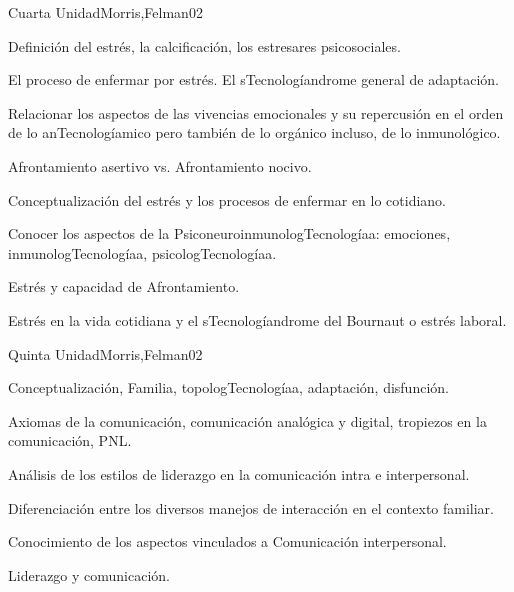 \begin{syllabus}
\begin{unit}{Cuarta Unidad}{Morris,Felman}{0}{2}
\begin{topics}
	\item Definición del estrés, la calcificación, los estresares psicosociales.
	\item El proceso de enfermar por estrés. El sTecnologíandrome general de adaptación.
	\item Relacionar los aspectos de las vivencias emocionales y su repercusión en el orden de lo anTecnologíamico pero también de lo orgánico incluso, de lo inmunológico.
	\item Afrontamiento asertivo vs. Afrontamiento nocivo.
\end{topics}
\begin{learningoutcomes}
	\item Conceptualización del estrés y los procesos de enfermar en lo cotidiano.
	\item Conocer los aspectos de la PsiconeuroinmunologTecnologíaa: emociones, inmunologTecnologíaa, psicologTecnologíaa.
	\item Estrés y capacidad de Afrontamiento.
	\item Estrés en la vida cotidiana y el sTecnologíandrome del Bournaut o estrés laboral.
\end{learningoutcomes}
\end{unit}

\begin{unit}{Quinta Unidad}{Morris,Felman}{0}{2}
\begin{topics}
	\item Conceptualización, Familia, topologTecnologíaa, adaptación, disfunción.
	\item Axiomas de la comunicación, comunicación analógica y digital, tropiezos en la comunicación, PNL.
	\item Análisis de los estilos de liderazgo en la comunicación intra e interpersonal.
\end{topics}
\begin{learningoutcomes}
	\item Diferenciación entre los diversos manejos de interacción en el contexto familiar.
	\item Conocimiento de los aspectos vinculados a Comunicación interpersonal.
	\item Liderazgo y comunicación.
\end{learningoutcomes}
\end{unit}


\end{syllabus}
